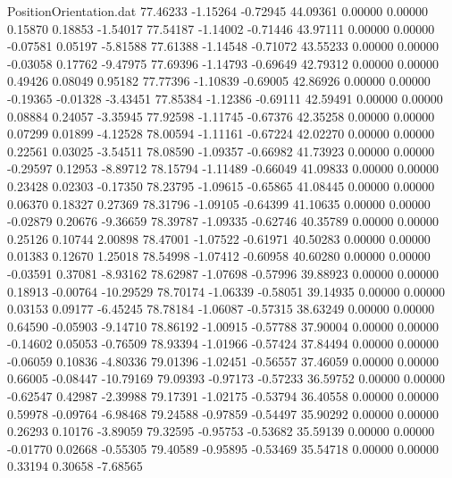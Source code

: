 \begin{filecontents}{PositionOrientation.dat}
  77.46233   -1.15264   -0.72945    44.09361    0.00000    0.00000    0.15870    0.18853   -1.54017
  77.54187   -1.14002   -0.71446    43.97111    0.00000    0.00000   -0.07581    0.05197   -5.81588
  77.61388   -1.14548   -0.71072    43.55233    0.00000    0.00000   -0.03058    0.17762   -9.47975
  77.69396   -1.14793   -0.69649    42.79312    0.00000    0.00000    0.49426    0.08049    0.95182
  77.77396   -1.10839   -0.69005    42.86926    0.00000    0.00000   -0.19365   -0.01328   -3.43451
  77.85384   -1.12386   -0.69111    42.59491    0.00000    0.00000    0.08884    0.24057   -3.35945
  77.92598   -1.11745   -0.67376    42.35258    0.00000    0.00000    0.07299    0.01899   -4.12528
  78.00594   -1.11161   -0.67224    42.02270    0.00000    0.00000    0.22561    0.03025   -3.54511
  78.08590   -1.09357   -0.66982    41.73923    0.00000    0.00000   -0.29597    0.12953   -8.89712
  78.15794   -1.11489   -0.66049    41.09833    0.00000    0.00000    0.23428    0.02303   -0.17350
  78.23795   -1.09615   -0.65865    41.08445    0.00000    0.00000    0.06370    0.18327    0.27369
  78.31796   -1.09105   -0.64399    41.10635    0.00000    0.00000   -0.02879    0.20676   -9.36659
  78.39787   -1.09335   -0.62746    40.35789    0.00000    0.00000    0.25126    0.10744    2.00898
  78.47001   -1.07522   -0.61971    40.50283    0.00000    0.00000    0.01383    0.12670    1.25018
  78.54998   -1.07412   -0.60958    40.60280    0.00000    0.00000   -0.03591    0.37081   -8.93162
  78.62987   -1.07698   -0.57996    39.88923    0.00000    0.00000    0.18913   -0.00764  -10.29529
  78.70174   -1.06339   -0.58051    39.14935    0.00000    0.00000    0.03153    0.09177   -6.45245
  78.78184   -1.06087   -0.57315    38.63249    0.00000    0.00000    0.64590   -0.05903   -9.14710
  78.86192   -1.00915   -0.57788    37.90004    0.00000    0.00000   -0.14602    0.05053   -0.76509
  78.93394   -1.01966   -0.57424    37.84494    0.00000    0.00000   -0.06059    0.10836   -4.80336
  79.01396   -1.02451   -0.56557    37.46059    0.00000    0.00000    0.66005   -0.08447  -10.79169
  79.09393   -0.97173   -0.57233    36.59752    0.00000    0.00000   -0.62547    0.42987   -2.39988
  79.17391   -1.02175   -0.53794    36.40558    0.00000    0.00000    0.59978   -0.09764   -6.98468
  79.24588   -0.97859   -0.54497    35.90292    0.00000    0.00000    0.26293    0.10176   -3.89059
  79.32595   -0.95753   -0.53682    35.59139    0.00000    0.00000   -0.01770    0.02668   -0.55305
  79.40589   -0.95895   -0.53469    35.54718    0.00000    0.00000    0.33194    0.30658   -7.68565

\end{filecontents}
